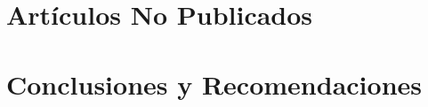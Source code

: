\documentclass[oneside,a4paper,11pt,openrany]{book}
\begin{document}

	
    

	
    

    
    

    \part{Artículos No Publicados}

    
    


    \part{Conclusiones y Recomendaciones}

    \pagestyle{fancyNormalChapterStyle}	%

    

    




% 	

% 	

	\backmatter

	\pagestyle{fancyUnnumberedSectionsStyle}	%

    
	



\end{document}
